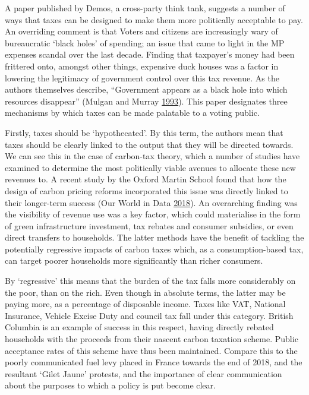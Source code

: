 \documentclass[]{article}
\begin{document}
A paper published by Demos, a cross-party think tank, suggests a number
of ways that taxes can be designed to make them more politically
acceptable to pay. An overriding comment is that Voters and citizens are
increasingly wary of bureaucratic `black holes' of spending; an issue
that came to light in the MP expenses scandal over the last decade.
Finding that taxpayer's money had been frittered onto, amongst other
things, expensive duck houses was a factor in lowering the legitimacy of
government control over this tax revenue. As the authors themselves
describe, ``Government appears as a black hole into which resources
disappear'' (Mulgan and Murray
\protect\hyperlink{ref-Mulgan1993}{1993}). This paper designates three
mechanisms by which taxes can be made palatable to a voting public.

Firstly, taxes should be `hypothecated'. By this term, the authors mean
that taxes should be clearly linked to the output that they will be
directed towards. We can see this in the case of carbon-tax theory,
which a number of studies have examined to determine the most
politically viable avenues to allocate these new revenues to. A recent
study by the Oxford Martin School found that how the design of carbon
pricing reforms incorporated this issue was directly linked to their
longer-term success (Our World in Data
\protect\hyperlink{ref-OurWorldinData2018}{2018}). An overarching
finding was the visibility of revenue use was a key factor, which could
materialise in the form of green infrastructure investment, tax rebates
and consumer subsidies, or even direct transfers to households. The
latter methods have the benefit of tackling the potentially regressive
impacts of carbon taxes which, as a consumption-based tax, can target
poorer households more significantly than richer consumers.

By `regressive' this means that the burden of the tax falls more
considerably on the poor, than on the rich. Even though in absolute
terms, the latter may be paying more, as a percentage of disposable
income. Taxes like VAT, National Insurance, Vehicle Excise Duty and
council tax fall under this category. British Columbia is an example of
success in this respect, having directly rebated households with the
proceeds from their nascent carbon taxation scheme. Public acceptance
rates of this scheme have thus been maintained. Compare this to the
poorly communicated fuel levy placed in France towards the end of 2018,
and the resultant `Gilet Jaune' protests, and the importance of clear
communication about the purposes to which a policy is put become clear.
\end{document}
